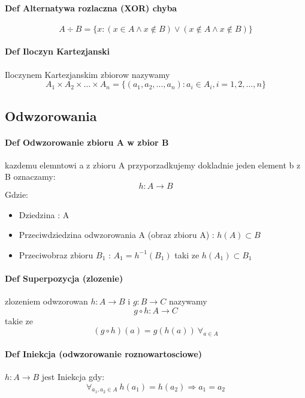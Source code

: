 \documentclass[a4paper]{article}
\begin{document}
    \paragraph{Def Alternatywa rozlaczna (XOR) chyba}
    \begin{equation}
        A \div B = \{ x : (x \in A \wedge x \notin B ) \vee (x \notin A \wedge x \notin B) \}
    \end{equation}
    \paragraph{Def Iloczyn Kartezjanski}
    Iloczynem Kartezjanskim zbiorow nazywamy
    \begin{equation}
        A_1 \times A_2 \times \ldots \times A_n = \{ (a_1,a_2, \ldots ,a_n ) : a_i \in A_i, i = 1,2,\ldots,n \}
    \end{equation}
\subsection{Odwzorowania}
\paragraph{Def Odwzorowanie zbioru A w zbior B}
kazdemu elemntowi a z zbioru A przyporzadkujemy dokladnie jeden element b z B oznaczamy:
\begin{equation}
h : A \rightarrow B
\end{equation}
Gdzie:
\begin{itemize}
    \item Dziedzina : A
    \item Przeciwdziedzina odwzorowania A (obraz zbioru A) : $ h(A) \subset B $
    \item Przeciwobraz zbioru $ B_1 $ : $ A_1 = h^{-1}(B_1) $ taki ze $ h(A_1) \subset B_1 $
\end{itemize}
\paragraph{Def Superpozycja (zlozenie)}
zlozeniem odwzorowan $ h : A \rightarrow B $ i $ g : B \rightarrow C $ nazywamy
\begin{equation}
    g \circ h : A \rightarrow C
\end{equation}
 takie ze
\begin{equation}
    (g \circ h)(a) = g(h(a)) \ \forall_{a \in A}
\end{equation}
\paragraph{Def Iniekcja (odwzorowanie roznowartosciowe)}
$ h:A \rightarrow B $ jest Iniekcja gdy:
\begin{equation}
    \forall_{a_1,a_2 \in A} \ h(a_1) = h(a_2) \Rightarrow a_1 = a_2
\end{equation}
\end{document}
